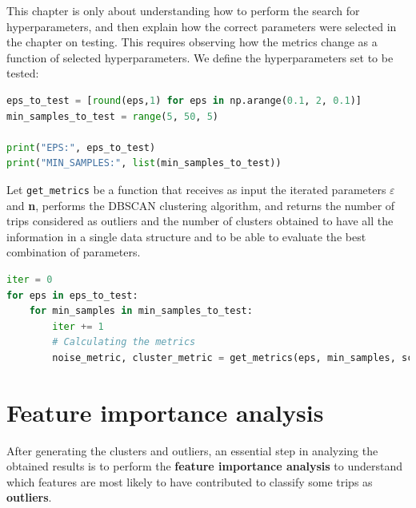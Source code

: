 This chapter is only about understanding how to perform the search for hyperparameters, and then explain how the correct parameters were selected in the chapter on testing.
This requires observing how the metrics change as a function of selected hyperparameters. We define the hyperparameters set to be tested:

\begin{minipage}{\linewidth}
\begin{lstlisting}[language=Python]
eps_to_test = [round(eps,1) for eps in np.arange(0.1, 2, 0.1)]
min_samples_to_test = range(5, 50, 5)

print("EPS:", eps_to_test)
print("MIN_SAMPLES:", list(min_samples_to_test))
\end{lstlisting}
\end{minipage}

Let \verb|get_metrics| be a function that receives as input the iterated parameters $\varepsilon$ and \textbf{n}, performs the DBSCAN clustering algorithm, and returns the number of trips considered as outliers and the number of clusters obtained to have all the information in a single data structure and to be able to evaluate the best combination of parameters.

\begin{minipage}{\linewidth}
\begin{lstlisting}[language=Python]
iter = 0
for eps in eps_to_test:
    for min_samples in min_samples_to_test:
        iter += 1
        # Calculating the metrics
        noise_metric, cluster_metric = get_metrics(eps, min_samples, scaled_df, iter)
\end{lstlisting}
\end{minipage}

\clearpage
\section{Feature importance analysis}
\label{sec:importance}

After generating the clusters and outliers, an essential step in analyzing the obtained results is to perform the \textbf{feature importance analysis} to understand which features are most likely to have contributed to classify some trips as \textbf{outliers}.

